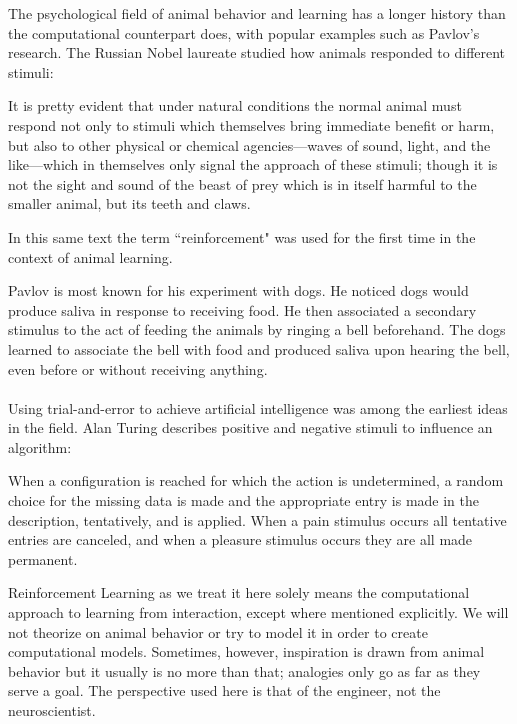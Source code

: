 The psychological field of animal behavior and learning
has a longer history than the computational counterpart does,
with popular examples such as Pavlov's research.
The Russian Nobel laureate studied how animals
responded to different stimuli:

\begin{displayquote}
It is pretty evident that under natural conditions the normal animal must
respond not only to stimuli which themselves bring immediate benefit or harm,
but also to other physical or chemical agencies—waves of sound,
light, and the like—which in themselves only signal the approach of these stimuli;
though it is not the sight and sound of the beast of prey
which is in itself harmful to the smaller animal, but its teeth and claws.
\end{displayquote}

In this same text the term ``reinforcement"
was used for the first time in the context of animal learning.

Pavlov is most known for his experiment with dogs.
He noticed dogs would produce saliva in response
to receiving food.
He then associated a secondary stimulus to the act
of feeding the animals
by ringing a bell beforehand.
The dogs learned to associate the bell
with food and produced saliva
upon hearing the bell,
even before or without receiving anything.

\paragraph{}
Using trial-and-error to achieve artificial intelligence
was among the earliest ideas in the field.
Alan Turing describes positive and negative stimuli
to influence an algorithm:

\begin{displayquote}
  When a configuration is reached for which the action is undetermined, a
random choice for the missing data is made and the appropriate entry is
made in the description, tentatively, and is applied. When a pain stimulus
occurs all tentative entries are canceled, and when a pleasure stimulus
occurs they are all made permanent.

\end{displayquote}

Reinforcement Learning as we treat it here
solely means the computational approach
to learning from interaction,
except where mentioned explicitly.
We will not theorize on animal behavior
or try to model it in order to create computational models.
Sometimes, however,
inspiration is drawn from animal behavior
but it usually is no more than that;
analogies only go as far as they serve a goal.
The perspective used here is that of the engineer,
not the neuroscientist.

